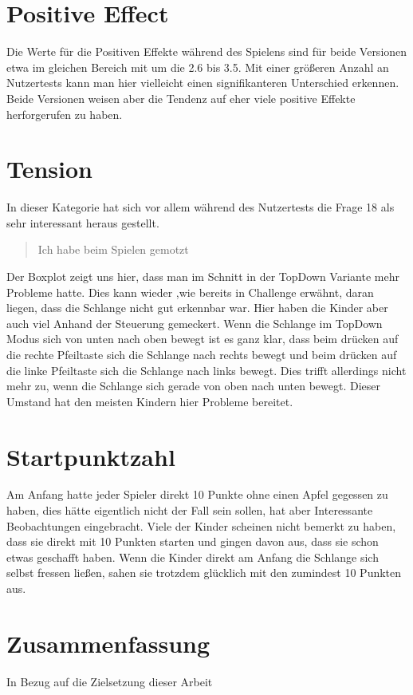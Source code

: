 \section{Positive Effect}
\label{sec:poseffDisk}
Die Werte für die Positiven Effekte während des Spielens sind für beide Versionen etwa im gleichen Bereich mit um die 2.6 bis 3.5. Mit einer größeren Anzahl an Nutzertests kann man hier vielleicht einen signifikanteren Unterschied erkennen. Beide Versionen weisen aber die Tendenz auf eher viele positive Effekte herforgerufen zu haben.
\section{Tension}
\label{sec:tensionDisk}
In dieser Kategorie hat sich vor allem während des Nutzertests die Frage 18 als sehr interessant heraus gestellt.
\begin{quote}
Ich habe beim Spielen gemotzt
\end{quote}
Der Boxplot zeigt uns hier, dass man im Schnitt in der TopDown Variante mehr Probleme hatte. Dies kann wieder ,wie bereits in Challenge erwähnt, daran liegen, dass die Schlange nicht gut erkennbar war. Hier haben die Kinder aber auch viel Anhand der Steuerung gemeckert. Wenn die Schlange im TopDown Modus sich von unten nach oben bewegt ist es ganz klar, dass beim drücken auf die rechte Pfeiltaste sich die Schlange nach rechts bewegt und beim drücken auf die linke Pfeiltaste sich die Schlange nach links bewegt. Dies trifft allerdings nicht mehr zu, wenn die Schlange sich gerade von oben nach unten bewegt. Dieser Umstand hat den meisten Kindern hier Probleme bereitet.

\section{Startpunktzahl}
\label{sec:startpointsDisk}
Am Anfang hatte jeder Spieler direkt 10 Punkte ohne einen Apfel gegessen zu haben, dies hätte eigentlich nicht der Fall sein sollen, hat aber Interessante Beobachtungen eingebracht. Viele der Kinder scheinen nicht bemerkt zu haben, dass sie direkt mit 10 Punkten starten und gingen davon aus, dass sie schon etwas geschafft haben. Wenn die Kinder direkt am Anfang die Schlange sich selbst fressen ließen, sahen sie trotzdem glücklich mit den zumindest 10 Punkten aus.
\section{Zusammenfassung}
\label{sec:conclusionDisk}
In Bezug auf die Zielsetzung dieser Arbeit


